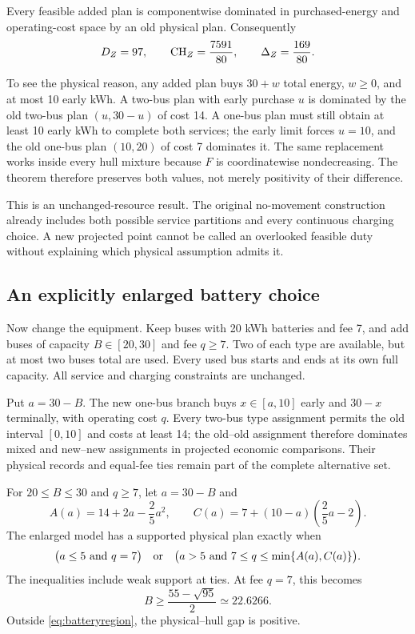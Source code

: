 \begin{theorem}\label{thm:movement}
Every feasible added plan is componentwise dominated in purchased-energy
and operating-cost space by an old physical plan. Consequently
\[
 D_Z=97,\qquad\mathrm{CH}_Z=\frac{7591}{80},\qquad
 \Delta_Z=\frac{169}{80}.
\]
\end{theorem}

To see the physical reason, any added plan buys $30+w$ total energy,
$w\ge0$, and at most 10 early kWh. A two-bus plan with early purchase $u$
is dominated by the old two-bus plan $(u,30-u)$ of cost 14. A one-bus
plan must still obtain at least 10 early kWh to complete both services;
the early limit forces $u=10$, and the old one-bus plan $(10,20)$ of
cost 7 dominates it. The same replacement works inside every hull mixture
because $F$ is coordinatewise nondecreasing. The theorem therefore preserves
both values, not merely positivity of their difference.

This is an unchanged-resource result. The original no-movement construction
already includes both possible service partitions and every continuous
charging choice. A new projected point cannot be called an overlooked
feasible duty without explaining which physical assumption admits it.

\subsection{An explicitly enlarged battery choice}
Now change the equipment. Keep buses with 20 kWh batteries and fee 7, and add buses
of capacity $B\in[20,30]$ and fee $q\ge7$. Two of each type are available,
but at most two buses total are used. Every used bus starts and ends at
its own full capacity. All service and charging constraints are unchanged.

Put $a=30-B$. The new one-bus branch buys $x\in[a,10]$ early and
$30-x$ terminally, with operating cost $q$. Every two-bus type assignment
permits the old interval $[0,10]$ and costs at least 14; the old--old
assignment therefore dominates mixed and new--new assignments in projected
economic comparisons. Their physical records and equal-fee ties remain
part of the complete alternative set.

\begin{theorem}\label{thm:battery}
For $20\le B\le30$ and $q\ge7$, let $a=30-B$ and
\[
 A(a)=14+2a-\frac25a^2,\qquad
 C(a)=7+(10-a)\left(\frac25a-2\right).
\]
The enlarged model has a supported physical plan exactly when
\begin{equation}\label{eq:batteryregion}
 \bigl(a\le5\ \hbox{and}\ q=7\bigr)
 \quad\hbox{or}\quad
 \bigl(a>5\ \hbox{and}\ 7\le q\le\min\{A(a),C(a)\}\bigr).
\end{equation}
The inequalities include weak support at ties. At fee $q=7$, this becomes
\begin{equation}\label{eq:batterythreshold}
 B\ge\frac{55-\sqrt{95}}2\simeq22.6266.
\end{equation}
Outside \eqref{eq:batteryregion}, the physical--hull gap is positive.
\end{theorem}

